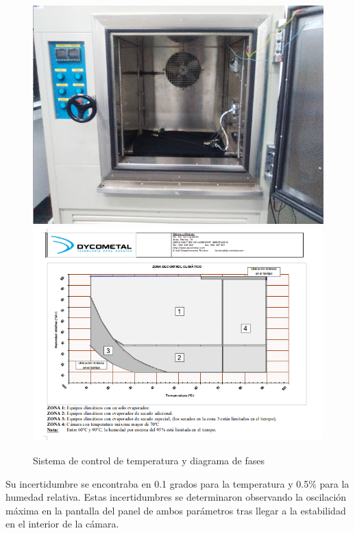 \begin{enumerate}
\begin{figure}[htb]
\centering
{
\includegraphics[scale=0.3]{InteriorTemperatura.png} 
}
{
\includegraphics[scale=0.3]{FichaTecnica.png} 
}
\caption{Sistema de control de temperatura y diagrama de fases~\cite{dycometal}\label{sistematemperatura}}
\end{figure}

Su incertidumbre se encontraba en 0.1 grados para la temperatura y 0.5\% para la humedad relativa. Estas incertidumbres se determinaron observando la oscilación  máxima en la pantalla del panel de ambos parámetros tras llegar a la estabilidad en el interior de la cámara.


\end{enumerate}
